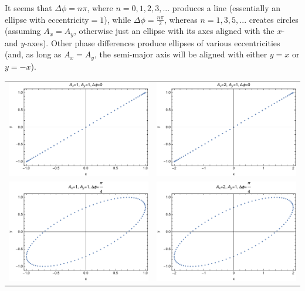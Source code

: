 \documentclass{article}
\begin{document}
It seems that $\Delta\phi = n\pi$, where $n=0,1,2,3,...$ produces a line (essentially an ellipse with eccentricity$=1$), while $\Delta\phi=\frac{n\pi}{2}$, whereas $n=1,3,5,...$ creates circles (assuming $A_x=A_y$, otherwise just an ellipse with its axes aligned with the $x$- and $y$-axes). Other phase differences produce ellipses of various eccentricities (and, as long as $A_x=A_y$, the semi-major axis will be aligned with either $y=x$ or $y=-x$).

\begin{tabular}{ll}
    \includegraphics[width=3in]{homework1/plot_1,1,0.pdf} & \includegraphics[width=3in]{homework1/plot_2,1,0.pdf} \\
    \includegraphics[width=3in]{homework1/plot_1,1,pi4.pdf} & \includegraphics[width=3in]{homework1/plot_2,1,pi4.pdf} \\

\end{tabular}
\end{document}

